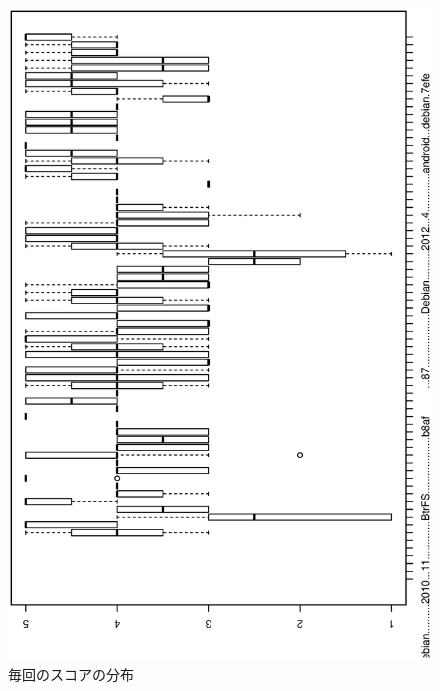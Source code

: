 \documentclass[mingoth,a4paper]{jsarticle}
\begin{document}
\begin{figure}[h]
\begin{center}
  \includegraphics[width=0.8\hsize,angle=270]{image201301/enquete_boxplot.eps}

\end{center}
 \caption{毎回のスコアの分布}\label{fig:enquete-score-distribution}
\end{figure}
\end{document}
